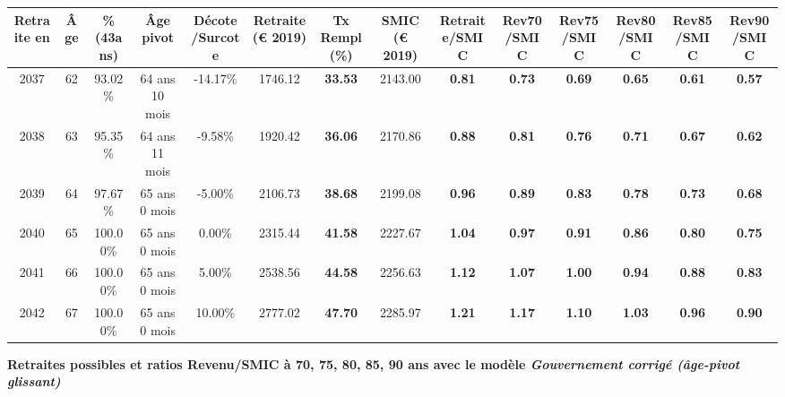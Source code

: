 \begin{adjustbox}{max width=\textwidth} 
\begin{tabular}[htb]{|c|c||c|c|c||c|c||c||c|c|c|c|c|c|} 
\hline 
 Retraite en &  Âge &  \%(43ans) &  Âge pivot &  Décote/Surcote &  Retraite (\euro{} 2019) &  Tx Rempl(\%) &  SMIC (\euro{} 2019) &  Retraite/SMIC &  Rev70/SMIC &  Rev75/SMIC &  Rev80/SMIC &  Rev85/SMIC &  Rev90/SMIC \\ 
\hline \hline 
 2037 &  62 &  93.02\% &  64 ans 10 mois &  -14.17\% &  1746.12 &  {\bf 33.53} &  2143.00 &  {\bf {\color{red} 0.81}} &  {\bf {\color{red} 0.73}} &  {\bf {\color{red} 0.69}} &  {\bf {\color{red} 0.65}} &  {\bf {\color{red} 0.61}} &  {\bf {\color{red} 0.57}} \\ 
\hline 
 2038 &  63 &  95.35\% &  64 ans 11 mois &  -9.58\% &  1920.42 &  {\bf 36.06} &  2170.86 &  {\bf {\color{red} 0.88}} &  {\bf {\color{red} 0.81}} &  {\bf {\color{red} 0.76}} &  {\bf {\color{red} 0.71}} &  {\bf {\color{red} 0.67}} &  {\bf {\color{red} 0.62}} \\ 
\hline 
 2039 &  64 &  97.67\% &  65 ans 0 mois &  -5.00\% &  2106.73 &  {\bf 38.68} &  2199.08 &  {\bf {\color{red} 0.96}} &  {\bf {\color{red} 0.89}} &  {\bf {\color{red} 0.83}} &  {\bf {\color{red} 0.78}} &  {\bf {\color{red} 0.73}} &  {\bf {\color{red} 0.68}} \\ 
\hline 
 2040 &  65 &  100.00\% &  65 ans 0 mois &  0.00\% &  2315.44 &  {\bf 41.58} &  2227.67 &  {\bf 1.04} &  {\bf {\color{red} 0.97}} &  {\bf {\color{red} 0.91}} &  {\bf {\color{red} 0.86}} &  {\bf {\color{red} 0.80}} &  {\bf {\color{red} 0.75}} \\ 
\hline 
 2041 &  66 &  100.00\% &  65 ans 0 mois &  5.00\% &  2538.56 &  {\bf 44.58} &  2256.63 &  {\bf 1.12} &  {\bf 1.07} &  {\bf 1.00} &  {\bf {\color{red} 0.94}} &  {\bf {\color{red} 0.88}} &  {\bf {\color{red} 0.83}} \\ 
\hline 
 2042 &  67 &  100.00\% &  65 ans 0 mois &  10.00\% &  2777.02 &  {\bf 47.70} &  2285.97 &  {\bf 1.21} &  {\bf 1.17} &  {\bf 1.10} &  {\bf 1.03} &  {\bf {\color{red} 0.96}} &  {\bf {\color{red} 0.90}} \\ 
\hline 
\hline 
\end{tabular} 
\end{adjustbox} 
 
 \vspace{0.1cm} 
{\bf \noindent Retraites possibles et ratios Revenu/SMIC à 70, 75, 80, 85, 90 ans avec le modèle \emph{Gouvernement corrigé (âge-pivot glissant)}}  
 
